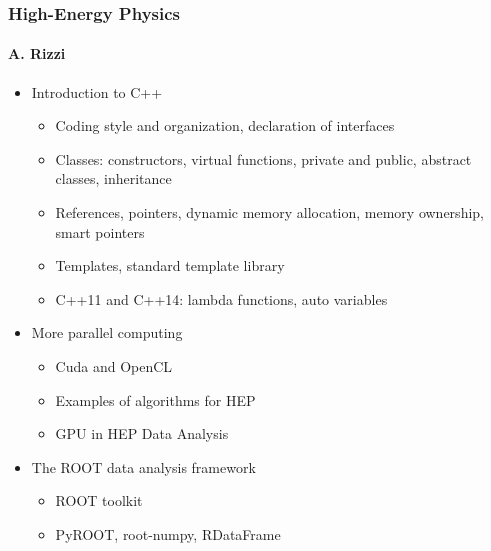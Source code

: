 \documentclass[9pt]{beamer}
\begin{document}
\begin{frame}
  \frametitle{High-Energy Physics}
  \framesubtitle{A. Rizzi}
  \begin{itemize}
  \item Introduction to C++
    \begin{itemize}
    \item Coding style and organization, declaration of interfaces
    \item Classes: constructors, virtual functions, private and public,
      abstract classes, inheritance
    \item References, pointers, dynamic memory allocation, memory ownership,
      smart pointers
    \item Templates, standard template library
    \item C++11 and C++14: lambda functions, auto variables
    \end{itemize}
  \item More parallel computing
    \begin{itemize}
    \item Cuda and OpenCL
    \item Examples of algorithms for HEP
    \item GPU in HEP Data Analysis
    \end{itemize}
  \item The ROOT data analysis framework
    \begin{itemize}
    \item ROOT toolkit
    \item PyROOT, root-numpy, RDataFrame
    \end{itemize}
  \end{itemize}
\end{frame}
\end{document}
